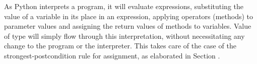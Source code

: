 ﻿\documentclass{IOS-Book-Article}
\begin{document}
\begin{mdP}[data-line={684}]%
{}As Python interprets a program, it will evaluate expressions, 
substituting the value of a variable in its place in an 
expression, applying operators (methods) to 
parameter values and assigning the return values of methods
to variables. Value of type %
{}%
{} will simply flow
through this interpretation, without necessitating any change 
to the program or the interpreter. This takes care
of the case of the strongest-postcondition rule for assignment,
as elaborated in Section%
{}{\mdNbsp}%
{}.%
\end{mdP}%
\end{document}
